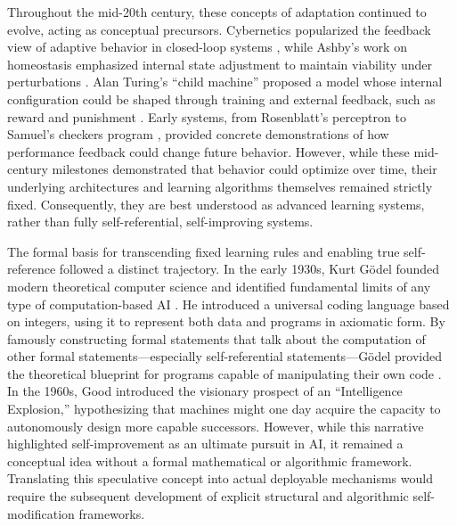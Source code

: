 \documentclass{article}
\begin{document}
Throughout the mid-20th century, these concepts of adaptation continued to evolve, acting as conceptual precursors. Cybernetics popularized the feedback view of adaptive behavior in closed-loop systems \citep{wiener1948cybernetics}, while Ashby's work on homeostasis emphasized internal state adjustment to maintain viability under perturbations \citep{ashby1952design}. Alan Turing's ``child machine'' proposed a model whose internal configuration could be shaped through training and external feedback, such as reward and punishment \citep{Turing1948IntelligentMachinery, turing1950computing}. Early systems, from Rosenblatt's perceptron \citep{rosenblatt1958perceptron} to Samuel's checkers program \citep{samuel1959some}, provided concrete demonstrations of how performance feedback could change future behavior. However, while these mid-century milestones demonstrated that behavior could optimize over time, their underlying architectures and learning algorithms themselves remained strictly fixed. Consequently, they are best understood as advanced learning systems, rather than fully self-referential, self-improving systems. 

The formal basis for transcending fixed learning rules and enabling true self-reference followed a distinct trajectory. In the early 1930s, Kurt Gödel founded modern theoretical computer science and identified fundamental limits of any type of computation-based AI \citep{godel1931formal}. He introduced a universal coding language based on integers, using it to represent both data and programs in axiomatic form. By famously constructing formal statements that talk about the computation of other formal statements—especially self-referential statements—Gödel provided the theoretical blueprint for programs capable of manipulating their own code \citep{schmidhuber2022annotated}. In the 1960s, Good \citep{good1966speculations} introduced the visionary prospect of an ``Intelligence Explosion,'' hypothesizing that machines might one day acquire the capacity to autonomously design more capable successors. However, while this narrative highlighted self-improvement as an ultimate pursuit in AI, it remained a conceptual idea without a formal mathematical or algorithmic framework. Translating this speculative concept into actual deployable mechanisms would require the subsequent development of explicit structural and algorithmic self-modification frameworks.
\end{document}
